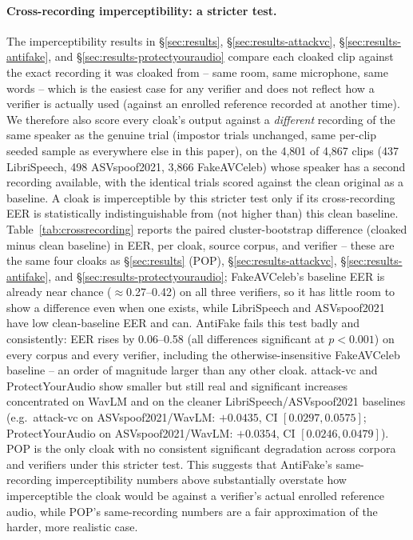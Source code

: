 \documentclass[11pt]{article}
\begin{document}
\paragraph{Cross-recording imperceptibility: a stricter test.} The
imperceptibility results in
\S\ref{sec:results}, \S\ref{sec:results-attackvc},
\S\ref{sec:results-antifake}, and \S\ref{sec:results-protectyouraudio}
compare each
cloaked clip against the exact recording it was cloaked from -- same
room, same microphone, same words -- which is the easiest case for any
verifier and does not reflect how a verifier is actually used (against
an enrolled reference recorded at another time). We therefore also
score every cloak's output against a \emph{different} recording of the
same speaker as the genuine trial (impostor trials unchanged, same
per-clip seeded sample as everywhere else in this paper), on the 4,801
of 4,867 clips (437 LibriSpeech, 498 ASVspoof2021, 3,866 FakeAVCeleb)
whose speaker has a second recording available, with the identical
trials scored against the clean original as a baseline. A cloak is
imperceptible by this stricter test only if its cross-recording EER is
statistically indistinguishable from (not higher than) this clean
baseline. Table~\ref{tab:crossrecording} reports the paired
cluster-bootstrap difference (cloaked minus clean baseline) in EER,
per cloak, source corpus, and verifier -- these are the same four
cloaks as \S\ref{sec:results} (POP), \S\ref{sec:results-attackvc},
\S\ref{sec:results-antifake}, and \S\ref{sec:results-protectyouraudio};
FakeAVCeleb's baseline EER is already near chance ($\approx$0.27--0.42)
on all three verifiers, so it has little room to show a difference
even when one exists, while LibriSpeech and ASVspoof2021 have low
clean-baseline EER and can. AntiFake fails this test badly and
consistently: EER rises by 0.06--0.58 (all differences significant at
$p<0.001$) on every corpus and every verifier, including the
otherwise-insensitive FakeAVCeleb baseline -- an order of magnitude
larger than any other cloak. attack-vc and ProtectYourAudio show
smaller but still real and significant increases concentrated on
WavLM and on the cleaner LibriSpeech/ASVspoof2021 baselines (e.g.\
attack-vc on ASVspoof2021/WavLM: $+0.0435$, CI $[0.0297, 0.0575]$;
ProtectYourAudio on ASVspoof2021/WavLM: $+0.0354$, CI $[0.0246,
0.0479]$). POP is the only cloak with no consistent significant
degradation across corpora and verifiers under this stricter test.
This suggests that AntiFake's same-recording imperceptibility numbers
above substantially overstate how imperceptible the cloak would be
against a verifier's actual enrolled reference audio, while POP's
same-recording numbers are a fair approximation of the harder,
more realistic case.
\end{document}
